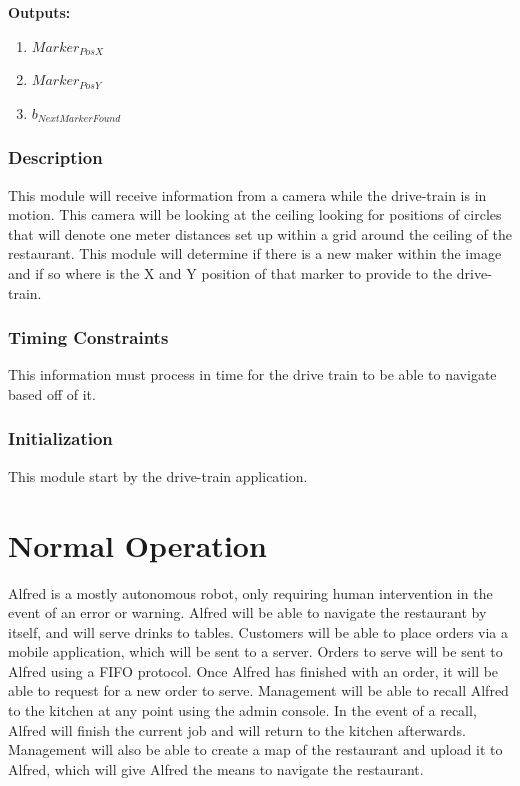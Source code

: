 \documentclass [10pt]{article}
\begin{document}
\textbf{Outputs: } 
\begin{enumerate}
	\item $ Marker_{PosX} $
	\item $ Marker_{PosY} $
	\item $ b_{NextMarkerFound} $
	
\end{enumerate}

\subsubsection{Description}
This module will receive information from a camera while the drive-train is in motion. This camera will be looking at the ceiling looking for positions of circles that will denote one meter distances set up within a grid around the ceiling of the restaurant. This module will determine if there is a new maker within the image and if so where is the X and Y position of that marker to provide to the drive-train.

\subsubsection{Timing Constraints}
This information must process in time for the drive train to be able to navigate based off of it.

\subsubsection{Initialization}
This module start by the drive-train application.


\section{Normal Operation}
Alfred is a mostly autonomous robot, only requiring human intervention in the event of an error or warning. Alfred will be able to navigate the restaurant by itself, and will serve drinks to tables. Customers will be able to place orders via a mobile application, which will be sent to a server. Orders to serve will be sent to Alfred using a FIFO protocol. Once Alfred has finished with an order, it will be able to request for a new order to serve. Management will be able to recall Alfred to the kitchen at any point using the admin console. In the event of a recall, Alfred will finish the current job and will return to the kitchen afterwards. Management will also be able to create a map of the restaurant and upload it to Alfred, which will give Alfred the means to navigate the restaurant.
\end{document}
